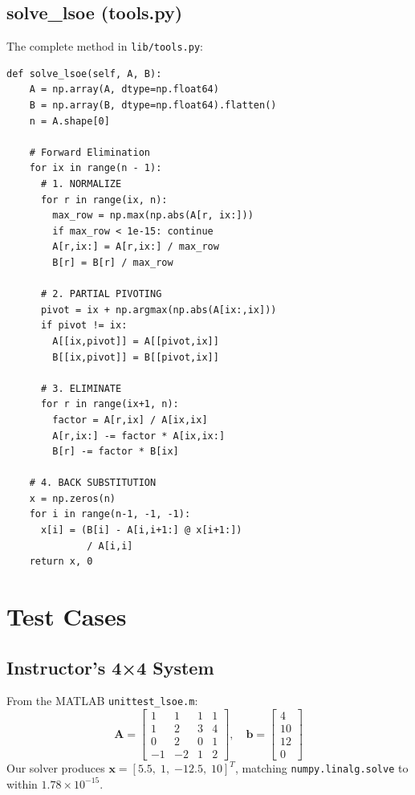 \documentclass[letterpaper,twocolumn,fleqn]{article}
\begin{document}
\subsection{solve\_lsoe (tools.py)}
The complete method in \texttt{lib/tools.py}:

\begin{lstlisting}
def solve_lsoe(self, A, B):
    A = np.array(A, dtype=np.float64)
    B = np.array(B, dtype=np.float64).flatten()
    n = A.shape[0]

    # Forward Elimination
    for ix in range(n - 1):
      # 1. NORMALIZE
      for r in range(ix, n):
        max_row = np.max(np.abs(A[r, ix:]))
        if max_row < 1e-15: continue
        A[r,ix:] = A[r,ix:] / max_row
        B[r] = B[r] / max_row

      # 2. PARTIAL PIVOTING
      pivot = ix + np.argmax(np.abs(A[ix:,ix]))
      if pivot != ix:
        A[[ix,pivot]] = A[[pivot,ix]]
        B[[ix,pivot]] = B[[pivot,ix]]

      # 3. ELIMINATE
      for r in range(ix+1, n):
        factor = A[r,ix] / A[ix,ix]
        A[r,ix:] -= factor * A[ix,ix:]
        B[r] -= factor * B[ix]

    # 4. BACK SUBSTITUTION
    x = np.zeros(n)
    for i in range(n-1, -1, -1):
      x[i] = (B[i] - A[i,i+1:] @ x[i+1:])
              / A[i,i]
    return x, 0
\end{lstlisting}

\section{Test Cases}

\subsection{Instructor's 4×4 System}
From the MATLAB \texttt{unittest\_lsoe.m}:
\[
\mathbf{A} = \begin{bmatrix}
1 & 1 & 1 & 1 \\
1 & 2 & 3 & 4 \\
0 & 2 & 0 & 1 \\
-1 & -2 & 1 & 2
\end{bmatrix}, \quad
\mathbf{b} = \begin{bmatrix} 4 \\ 10 \\ 12 \\ 0 \end{bmatrix}
\]
Our solver produces $\mathbf{x} = [5.5,\; 1,\; {-12.5},\; 10]^T$,
matching \texttt{numpy.linalg.solve} to within $1.78 \times 10^{-15}$.
\end{document}
